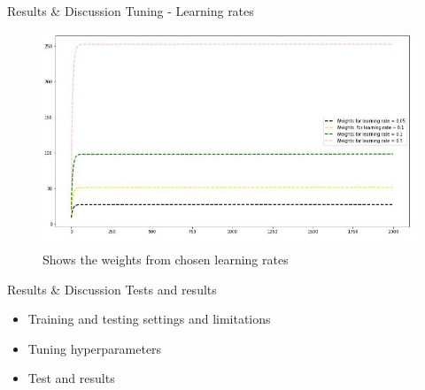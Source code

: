 \documentclass{beamer}
\begin{document}
\begin{frame}{Results \& Discussion }{Tuning - Learning rates\vphantom{(y}}
\vspace{-0.7em}
\begin{figure}
  \includegraphics[scale=0.5]{images/weights.JPG}
  \caption{Shows the weights from chosen learning rates}
\end{figure}
\end{frame}

\begin{frame}{Results \& Discussion }{Tests and results \vphantom{(y}}
\vspace{-0.7em}
\begin{itemize}
  \item Training and testing settings and limitations
  \item Tuning hyperparameters
  \item {\color{blue}Test and results}
\end{itemize}

\end{frame}
\end{document}
